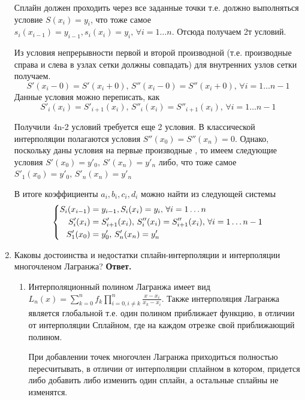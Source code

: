 \documentclass{article}
\begin{document}
\begin{enumerate}
	
	\noindent Сплайн должен проходить через все заданные точки т.е. должно выполняться условие $S(x_i)=y_i$, что тоже самое $s_i(x_{i-1})=y_{i-1}, s_i(x_i)=y_i, \, \forall i=1 \ldots n$. Отсюда получаем 2т условий.
	
	
	\noindent Из условия непрерывности первой и второй производной (т.е. производные справа и слева в узлах сетки должны совпадать) для внутренних узлов сетки получаем.
	\[
	S'(x_i-0)=S'(x_i+0), \, S''(x_i-0)=S''(x_i+0), \, \forall i=1 \ldots n-1
	\]
	Данные условия можно переписать, как
	\[
	S'_i(x_i)=S'_{i+1}(x_i), \, S''_i(x_i)=S''_{i+1}(x_i), \, \forall i=1 \ldots n-1
	\]
	
	
	\noindent Получили 4n-2 условий требуется еще 2 условия. В классической интерполяции полагаются условия $S''(x_0)=S''(x_n)=0$. Однако, поскольку даны условия на первые производные , то имеем следующие условия $S'(x_0)=y'_0, \, S'(x_n)=y'_n$ либо, что тоже самое $S'_1(x_0)=y'_0,\, S'_n(x_n)=y'_n$
	
	
	\noindent В итоге коэффициенты $a_i, b_i,c_i,d_i$ можно найти из следующей системы
	\begin{equation}
		\centering
		\left\{\begin{split}
			S_i(x_{i-1})&=y_{i-1}, S_i(x_i)=y_i, \, \forall i=1 \ldots n \\
			S'_i(x_i)&=S'_{i+1}(x_i), \, S''_i(x_i)=S''_{i+1}(x_i), \, \forall i=1 \ldots n-1\\
			S'_1(x_0)&=y'_0,\, S'_n(x_n)=y'_n
		\end{split}\right.
	\end{equation}

        \item Каковы достоинства и недостатки сплайн-интерполяции
        и интерполяции многочленом Лагранжа?
        \newline 
        {\bfseries Ответ. } 
        \begin{enumerate}
            \item Интерполяционный полином Лагранжа имеет вид $L_n(x)=\sum_{k=0}^{n}f_k\prod_{i=0,i\neq k}^{n} \frac{x-x_i}{x_k-x_i}$. Также интерполяция Лагранжа является глобальной т.е. один полином приближает функцию, в отличии от интерполяции Сплайном, где на каждом отрезке свой приближающий полином.
	
	
            \noindent При добавлении точек многочлен Лагранжа приходиться полностью пересчитывать, в отличии от интерполяции сплайном в котором, придется либо добавить либо изменить один сплайн, а остальные сплайны не изменятся.
            

\end{enumerate}
\end{enumerate}
\end{document}
